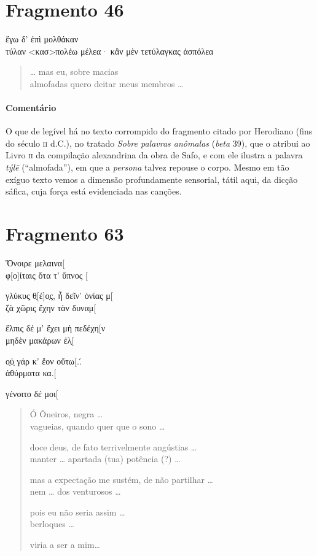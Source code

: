 \section{Fragmento 46}

\begin{gkverse}
ἔγω δ’ ἐπὶ μολθάκαν\\
τύλαν <κασ>πολέω \dagger{}μέλεα· κἂν μὲν τετύλαγκας ἀσπόλεα\dagger{}
\end{gkverse}

\begin{verse}
\ldots{} mas eu, sobre macias\\
almofadas quero deitar meus membros \ldots{}
\end{verse}

{\paragraph{Comentário} O que de legível há no texto corrompido do fragmento citado por Herodiano (fins do século \textsc{ii} d.C.), no tratado \textit{Sobre palavras anômalas} (\textit{beta} 39), que o atribui ao Livro \textsc{ii} da compilação alexandrina da obra de Safo, e com ele ilustra a palavra \textit{týlē} (``almofada''), em que a \textit{persona} talvez repouse o corpo. Mesmo em tão exíguo texto vemos a dimensão profundamente sensorial, tátil aqui, da dicção sáfica, cuja força está evidenciada nas canções.}



\pagebreak
\section{Fragmento 63}

\begin{gkverse}
Ὄνοιρε μελαινα[\\
φ[ο]ίταις ὄτα τ’ ὔπνος [

γλύκυς̣ θ̣[έ]ο̣ς, ἦ δεῖν’ ὀνίας μ[\\
ζὰ χῶρις ἔχην τὰν δυναμ[

ἔλπις δέ μ’ ἔχει μὴ πεδέχη[ν\\
μηδὲν μακάρων ἐλ̣[

ο̣ὐ̣ γάρ κ’ ἔον οὔτω[..́   \\
ἀθύρματα κα.[

γένοιτο δέ μοι[
\end{gkverse}

\begin{verse}
Ó Ôneiros, negra \ldots{}\\
vagueias, quando quer que o sono \ldots{}

doce deus, de fato terrivelmente angústias \ldots{}\\
manter \ldots{} apartada (tua) potência (?) \ldots{}

mas a expectação me sustém, de não partilhar \ldots{}\\
nem \ldots{}  dos venturosos \ldots{}

pois eu não seria assim \ldots{}\\
berloques \ldots{}

viria a ser a mim\ldots{}
\end{verse}

